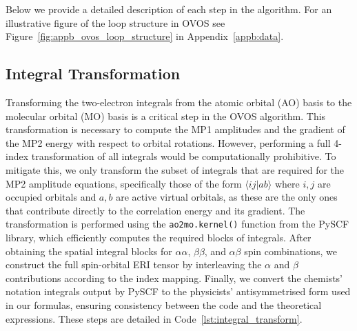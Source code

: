 Below we provide a detailed description of each step in the algorithm. For an illustrative figure of the loop structure in OVOS see Figure~\ref{fig:appb_ovos_loop_structure} in Appendix~\ref{appb:data}.

\newpage

\subsection{Integral Transformation}

Transforming the two-electron integrals from the atomic orbital (AO) basis to the molecular orbital (MO) basis is a critical step in the OVOS algorithm. This transformation is necessary to compute the MP1 amplitudes and the gradient of the MP2 energy with respect to orbital rotations. However, performing a full 4-index transformation of all integrals would be computationally prohibitive. To mitigate this, we only transform the subset of integrals that are required for the MP2 amplitude equations, specifically those of the form $\langle ij|ab\rangle$ where $i,j$ are occupied orbitals and $a,b$ are active virtual orbitals, as these are the only ones that contribute directly to the correlation energy and its gradient. The transformation is performed using the \texttt{ao2mo.kernel()} function from the PySCF library, which efficiently computes the required blocks of integrals. After obtaining the spatial integral blocks for $\alpha\alpha$, $\beta\beta$, and $\alpha\beta$ spin combinations, we construct the full spin-orbital ERI tensor by interleaving the $\alpha$ and $\beta$ contributions according to the index mapping. Finally, we convert the chemists' notation integrals output by PySCF to the physicists' antisymmetrised form used in our formulas, ensuring consistency between the code and the theoretical expressions. These steps are detailed in Code~\ref{lst:integral_transform}.

